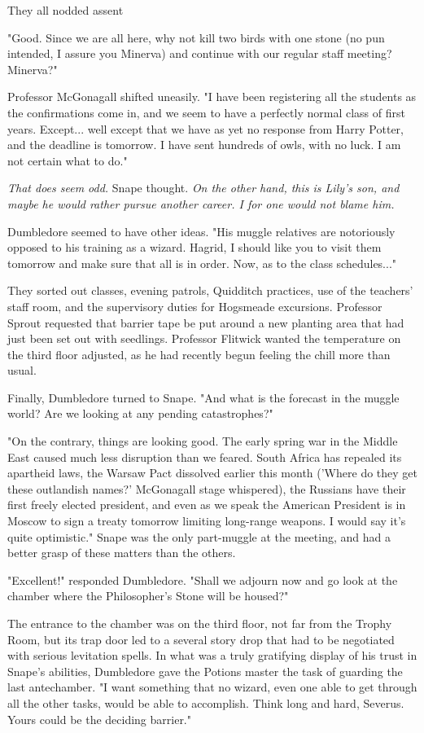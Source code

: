 \documentclass[a4paper,11pt]{article}
\begin{document}
They all nodded assent

"Good. Since we are all here, why not kill two birds with one stone (no pun intended, I assure you Minerva) and continue with our regular staff meeting? Minerva?"

Professor McGonagall shifted uneasily. "I have been registering all the students as the confirmations come in, and we seem to have a perfectly normal class of first years. Except... well except that we have as yet no response from Harry Potter, and the deadline is tomorrow. I have sent hundreds of owls, with no luck. I am not certain what to do."

\emph{That does seem odd.} Snape thought. \emph{On the other hand, this is Lily's son, and maybe he would rather pursue another career. I for one would not blame him.}

Dumbledore seemed to have other ideas. "His muggle relatives are notoriously opposed to his training as a wizard. Hagrid, I should like you to visit them tomorrow and make sure that all is in order. Now, as to the class schedules..."

They sorted out classes, evening patrols, Quidditch practices, use of the teachers' staff room, and the supervisory duties for Hogsmeade excursions. Professor Sprout requested that barrier tape be put around a new planting area that had just been set out with seedlings. Professor Flitwick wanted the temperature on the third floor adjusted, as he had recently begun feeling the chill more than usual.

Finally, Dumbledore turned to Snape. "And what is the forecast in the muggle world? Are we looking at any pending catastrophes?"

"On the contrary, things are looking good. The early spring war in the Middle East caused much less disruption than we feared. South Africa has repealed its apartheid laws, the Warsaw Pact dissolved earlier this month ('Where do they get these outlandish names?' McGonagall stage whispered), the Russians have their first freely elected president, and even as we speak the American President is in Moscow to sign a treaty tomorrow limiting long-range weapons. I would say it's quite optimistic." Snape was the only part-muggle at the meeting, and had a better grasp of these matters than the others.

"Excellent!" responded Dumbledore. "Shall we adjourn now and go look at the chamber where the Philosopher's Stone will be housed?"

The entrance to the chamber was on the third floor, not far from the Trophy Room, but its trap door led to a several story drop that had to be negotiated with serious levitation spells. In what was a truly gratifying display of his trust in Snape's abilities, Dumbledore gave the Potions master the task of guarding the last antechamber. "I want something that no wizard, even one able to get through all the other tasks, would be able to accomplish. Think long and hard, Severus. Yours could be the deciding barrier."
\end{document}
